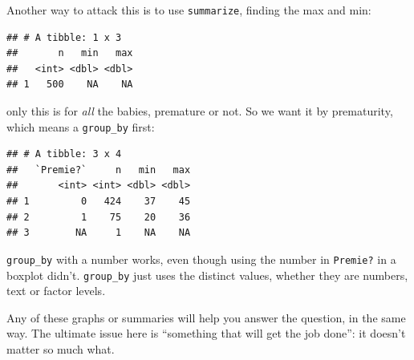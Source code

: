 \documentclass[]{tufte-book}
\newenvironment{Shaded}{}{}
\newcommand{\DataTypeTok}[1]{\textcolor[rgb]{0.56,0.13,0.00}{#1}}
\newcommand{\KeywordTok}[1]{\textcolor[rgb]{0.00,0.44,0.13}{\textbf{#1}}}
\newcommand{\NormalTok}[1]{#1}
\newcommand{\OperatorTok}[1]{\textcolor[rgb]{0.40,0.40,0.40}{#1}}
\newcommand{\StringTok}[1]{\textcolor[rgb]{0.25,0.44,0.63}{#1}}
\theoremstyle{definition}
\theoremstyle{definition}
\theoremstyle{definition}
\theoremstyle{remark}
\begin{document}
Another way to attack this is to use \texttt{summarize}, finding the max
and min:

\begin{Shaded}
\end{Shaded}

\begin{verbatim}
## # A tibble: 1 x 3
##       n   min   max
##   <int> <dbl> <dbl>
## 1   500    NA    NA
\end{verbatim}

only this is for \emph{all} the babies, premature or not.
 So we want it by
prematurity, which means a \texttt{group\_by} first:

\begin{Shaded}
\end{Shaded}

\begin{verbatim}
## # A tibble: 3 x 4
##   `Premie?`     n   min   max
##       <int> <int> <dbl> <dbl>
## 1         0   424    37    45
## 2         1    75    20    36
## 3        NA     1    NA    NA
\end{verbatim}

\texttt{group\_by} with a number works, even though using the number in
\texttt{Premie?} in a boxplot didn't. \texttt{group\_by} just uses the
distinct values, whether they are numbers, text or factor levels.

Any of these graphs or summaries will help you answer the question, in
the same way. The ultimate issue here is ``something that will get the
job done'': it doesn't matter so much what.
\end{document}

